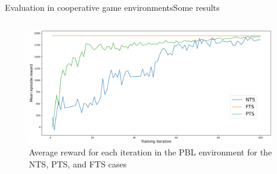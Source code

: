 \begin{frame}{Evaluation in cooperative game environments}{Some results}
\begin{columns}
        \begin{column}{0.5\textwidth}
            \begin{figure}[h!]
                \centering
                \includegraphics[width=0.95\textwidth]{figures/prahom_learning_curve.png}
                \caption*{Average reward for each iteration in the PBL environment for the NTS, PTS, and FTS cases}
                \label{fig:prahom_learning_curve}
            \end{figure}
        \end{column}

    \end{columns}

\end{frame}

